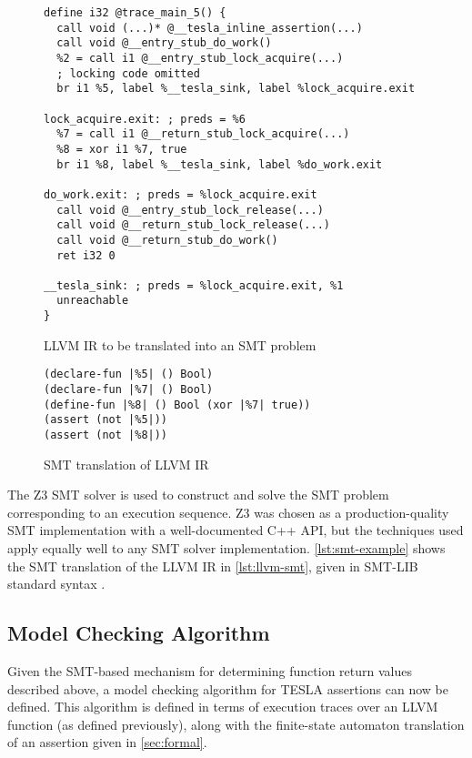 \begin{figure}
  \begin{verbatim}
define i32 @trace_main_5() {
  call void (...)* @__tesla_inline_assertion(...)
  call void @__entry_stub_do_work()
  %2 = call i1 @__entry_stub_lock_acquire(...)
  ; locking code omitted
  br i1 %5, label %__tesla_sink, label %lock_acquire.exit

lock_acquire.exit: ; preds = %6
  %7 = call i1 @__return_stub_lock_acquire(...)
  %8 = xor i1 %7, true
  br i1 %8, label %__tesla_sink, label %do_work.exit

do_work.exit: ; preds = %lock_acquire.exit
  call void @__entry_stub_lock_release(...)
  call void @__return_stub_lock_release(...)
  call void @__return_stub_do_work()
  ret i32 0

__tesla_sink: ; preds = %lock_acquire.exit, %1
  unreachable
}
  \end{verbatim}
  \caption{LLVM IR to be translated into an SMT problem}
  \label{lst:llvm-smt}
\end{figure}

\begin{figure}
  \begin{verbatim}
(declare-fun |%5| () Bool)
(declare-fun |%7| () Bool)
(define-fun |%8| () Bool (xor |%7| true))
(assert (not |%5|))
(assert (not |%8|))
  \end{verbatim}
  \caption{SMT translation of LLVM IR}
  \label{lst:smt-example}
\end{figure}

The Z3 SMT solver \cite{de_moura_z3:_2008} is used to construct and solve the
SMT problem corresponding to an execution sequence. Z3 was chosen as a
production-quality SMT implementation with a well-documented C++ API, but the
techniques used apply equally well to any SMT solver implementation.
\autoref{lst:smt-example} shows the SMT translation of the LLVM IR in
\autoref{lst:llvm-smt}, given in SMT-LIB standard syntax \cite{BarST-SMT-10}.

\subsection{Model Checking Algorithm} \label{sec:mc}

Given the SMT-based mechanism for determining function return values described
above, a model checking algorithm for TESLA assertions can now be defined. This
algorithm is defined in terms of execution traces over an LLVM function (as
defined previously), along with the finite-state automaton translation of an
assertion given in \autoref{sec:formal}.


